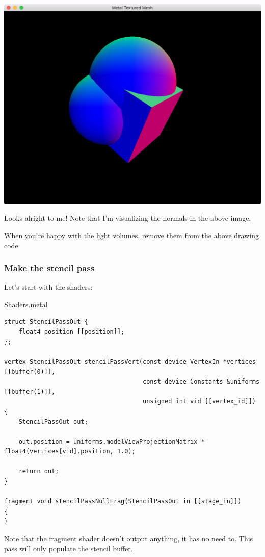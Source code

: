 \documentclass[11pt]{article}
\begin{document}
\begin{center}
\includegraphics[width=.9\linewidth]{../img/posts/implementing-deferred-shading-in-metal/lights-normal.png}
\end{center}

Looks alright to me! Note that I'm visualizing the normals in the above image.

When you're happy with the light volumes, remove them from the above drawing
code.

\subsubsection*{Make the stencil pass}
\label{sec:org936e39b}

Let's start with the shaders:

\uline{Shaders.metal}
\begin{verbatim}
struct StencilPassOut {
    float4 position [[position]];
};

vertex StencilPassOut stencilPassVert(const device VertexIn *vertices [[buffer(0)]],
                                      const device Constants &uniforms [[buffer(1)]],
                                      unsigned int vid [[vertex_id]]) {
    StencilPassOut out;

    out.position = uniforms.modelViewProjectionMatrix * float4(vertices[vid].position, 1.0);

    return out;
}

fragment void stencilPassNullFrag(StencilPassOut in [[stage_in]])
{
}
\end{verbatim}

Note that the fragment shader doesn't output anything, it has no need to. This
pass will only populate the stencil buffer.
\end{document}
